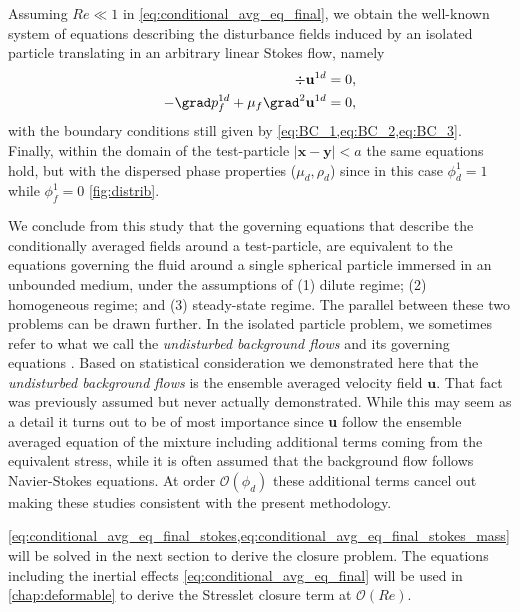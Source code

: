 Assuming $Re \ll 1$ in \ref{eq:conditional_avg_eq_final}, we obtain the well-known system of equations describing the disturbance fields induced by an isolated particle translating in an arbitrary linear Stokes flow, namely
\begin{align}
    \label{eq:conditional_avg_eq_final_stokes_mass}
    \div \textbf{u}^{1d} &= 0,  \\
    - \grad p_f^{1d} 
    + \mu_f \grad^2 \textbf{u}^{1d} 
    &= 0, 
    \label{eq:conditional_avg_eq_final_stokes}
\end{align}
with the boundary conditions still given by \ref{eq:BC_1,eq:BC_2,eq:BC_3}. 
Finally, within the domain of the test-particle $|\textbf{x}-\textbf{y}|<a$ the same equations hold, but with the dispersed phase properties ($\mu_d,\rho_d$) since in this case $\phi_d^1= 1$ while $\phi_f^1 =0$ \ref{fig:distrib}. 

We conclude from this study that the governing equations that describe the conditionally averaged fields around a test-particle, are equivalent to the equations governing the fluid around a single spherical particle immersed in an unbounded medium, 
under the assumptions of (1) dilute regime; (2) homogeneous regime; and (3) steady-state regime. 
The parallel between these two problems can be drawn further. 
In the isolated particle problem, we sometimes refer to what we call the \textit{undisturbed background flows} and its governing equations \citet{stone2001inertial}. 
Based on statistical consideration we demonstrated here that the \textit{undisturbed background flows} is the ensemble averaged velocity field $\textbf{u}$. 
That fact was previously assumed \citep{jackson1997locally,zhang1994ensemble} but never actually demonstrated. 
While this may seem as a detail it turns out to be of most importance since \textbf{u} follow the ensemble averaged equation of the mixture including additional terms coming from the equivalent stress, while it is often assumed that the background flow follows Navier-Stokes equations. 
At order $\mathcal{O}(\phi_d)$ these additional terms cancel out making these studies consistent with the present methodology. 

\ref{eq:conditional_avg_eq_final_stokes,eq:conditional_avg_eq_final_stokes_mass} will be solved in the next section to derive the closure problem. 
The equations including the inertial effects \eqref{eq:conditional_avg_eq_final} will be used in \ref{chap:deformable} to derive the Stresslet closure term at $\mathcal{O}(Re)$.
 


